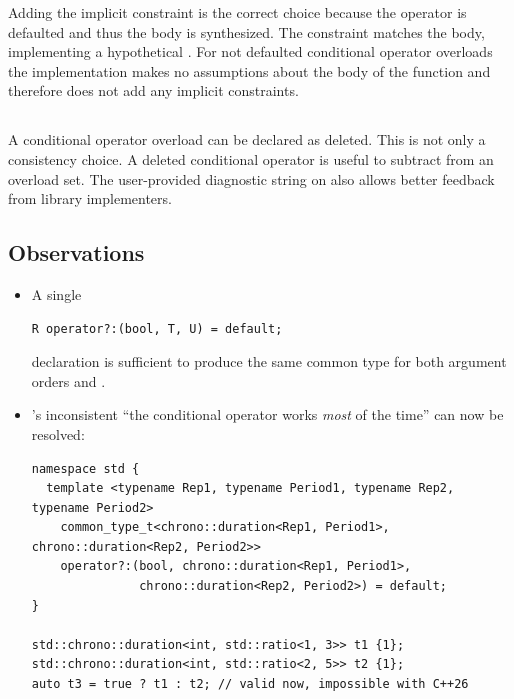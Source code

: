Adding the implicit constraint is the correct choice because the operator is
defaulted and thus the body is synthesized.
The constraint matches the body, implementing a hypothetical
.
For not defaulted conditional operator overloads the implementation makes no
assumptions about the body of the function and therefore does not add any
implicit constraints.

\subsection{}
A conditional operator overload can be declared as deleted.
This is not only a consistency choice.
A deleted conditional operator is useful to subtract from an overload set.
The user-provided diagnostic string on  also allows better
feedback from library implementers.

\subsection{Observations}
\begin{itemize}
  \item A single
    \medskip\begin{lstlisting}[style=Vc]
R operator?:(bool, T, U) = default;
    \end{lstlisting}
    declaration is sufficient to produce the same common type  for both
    argument orders  and .

  \item {}'s inconsistent “the conditional operator works
    \emph{most} of the time” can now be resolved:
    \medskip\begin{lstlisting}[style=Vc]
namespace std {
  template <typename Rep1, typename Period1, typename Rep2, typename Period2>
    common_type_t<chrono::duration<Rep1, Period1>, chrono::duration<Rep2, Period2>>
    operator?:(bool, chrono::duration<Rep1, Period1>,
               chrono::duration<Rep2, Period2>) = default;
}

std::chrono::duration<int, std::ratio<1, 3>> t1 {1};
std::chrono::duration<int, std::ratio<2, 5>> t2 {1};
auto t3 = true ? t1 : t2; // valid now, impossible with C++26
    \end{lstlisting}

\end{itemize}

